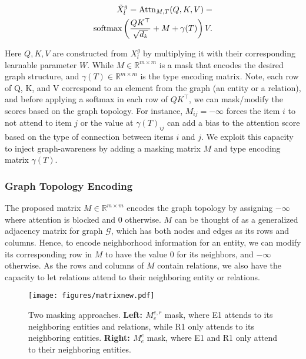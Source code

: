 \documentclass[11pt]{article}
\begin{document}
\begin{equation}
\label{eq:graph-rep}
\begin{split}
    \Tilde{X}_l^g = \operatorname{Attn}_{M,T}(Q, K, V)= \\
    \operatorname{softmax}\left(\frac{Q K^{\top}}{\sqrt{d_{k}}} + M + \gamma(T) \right) V.
\end{split}
\end{equation}

Here $Q,K,V$ are constructed from $X_l^g$ by multiplying it with their corresponding learnable parameter $W$. While $M \in \mathbb{R}^{m \times m}$ is a mask that encodes the desired graph structure, and $\gamma(T) \in \mathbb{R}^{m \times m}$ is the type encoding matrix. 
Note, each row of Q, K, and V correspond to an element from the graph (an entity or a relation), and before applying a softmax in each row of $QK^\top$, we can mask/modify the scores based on the graph topology. 
For instance, $M_{ij} = -\infty$ forces the item $i$ to not attend to item $j$ or the value at $\gamma(T)_{ij}$ can add a bias to the attention score based on the type of connection between items $i$ and $j$. We exploit this capacity to inject graph-awareness by adding a masking matrix $M$ and type encoding matrix $\gamma(T)$.

\subsubsection{Graph Topology Encoding}
The proposed matrix $M \in \mathbb{R}^{m \times m}$ encodes the graph topology by assigning $-\infty$ where attention is blocked and $0$ otherwise. $M$ can be thought of as a generalized adjacency matrix for graph $\mathcal{G}$, which has both nodes and edges as its rows and columns. Hence, to encode neighborhood information for an entity, we can modify its corresponding row in $M$ to have the value $0$ for its neighbors, and $-\infty$ otherwise. As the rows and columns of $M$ contain relations, we also have the capacity to let relations attend to their neighboring entity or relations.
\begin{figure}[t!]
\centering
\texttt{[image: figures/matrixnew.pdf]}
\caption{Two masking approaches. \textbf{Left:} $ {}^{}_{}M^{e,r}_{e} $ mask, where E1 attends to its neighboring entities and relations, while R1 only attends to its neighboring entities. \textbf{Right:} $ {}^{}_{}M^{e}_{e} $ mask, where E1 and R1 only attend to their neighboring entities.}
\label{fig:matrix}
\end{figure}
\end{document}
